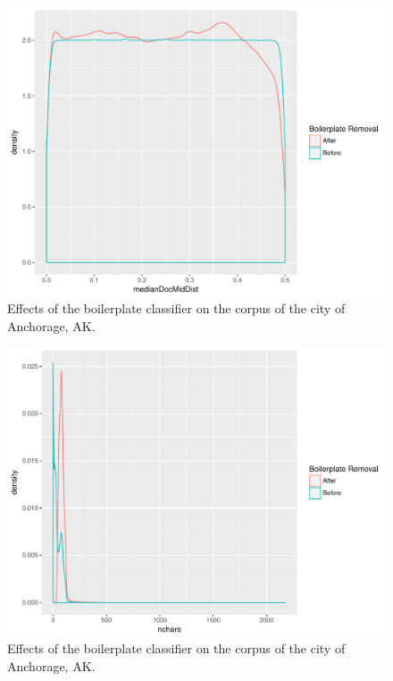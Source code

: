 \documentclass[11pt]{article}
\begin{document}
\begin{figure}[htp]
	\centering
	\caption{Effects of the boilerplate classifier on the corpus of the city of Anchorage, AK.}
	\label{boilerplate_before_after3}
	\includegraphics[width=\linewidth]{figures/boilerplateBeforeAfterMedianDocMidDist.pdf}
\end{figure}
\begin{figure}[htp]
	\centering
	\caption{Effects of the boilerplate classifier on the corpus of the city of Anchorage, AK.}
	\label{boilerplate_before_after4}
	\includegraphics[width=\linewidth]{figures/boilerplateBeforeAfterNchars.pdf}
\end{figure}
\end{document}

